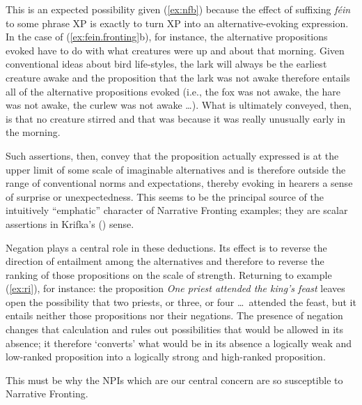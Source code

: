 \documentclass[output=paper,colorlinks,citecolor=brown]{langscibook}
\begin{document}
This is an expected possibility given (\ref{ex:nfb}) because the effect of suffixing {\itshape féin} to some phrase XP is exactly to turn XP into an alternative-evoking expression. In the case of (\ref{ex:fein.fronting}b), for instance, the alternative propositions evoked have to do with what creatures were up and about that morning. Given conventional ideas about bird life-styles, the lark will always be the earliest creature awake and the proposition that the lark was not awake therefore entails all of the alternative propositions evoked (i.e., the fox was not awake, the hare was not awake, the curlew was not awake \ldots{}). What is ultimately conveyed, then, is that no creature stirred and that was because it was really unusually early in the morning. 

Such assertions, then, convey that the proposition actually expressed is at the upper limit of some scale of imaginable alternatives and is therefore outside the range of conventional norms and expectations, thereby evoking in hearers a sense of surprise or unexpectedness. This seems to be the principal source of the intuitively “emphatic” character of Narrative Fronting examples; they are scalar assertions in Krifka's (\citeyear{krifka:95}) sense.

Negation plays a central role in these deductions. Its effect is to reverse the direction of entailment among the alternatives and therefore to reverse the ranking of those propositions on the scale of strength.  Returning to example (\ref{ex:ri}), for instance: the proposition {\itshape One   priest attended the king's feast} leaves open the possibility that two priests, or three, or four \ldots\ attended the feast, but it entails neither those propositions nor their negations. The presence of negation changes that calculation and rules out possibilities that would be allowed in its absence; it therefore `converts' what would be in its absence a logically weak and low-ranked proposition into a logically strong and high-ranked proposition.

This must be why the NPIs which are our central concern are so susceptible to Narrative Fronting.
\end{document}
